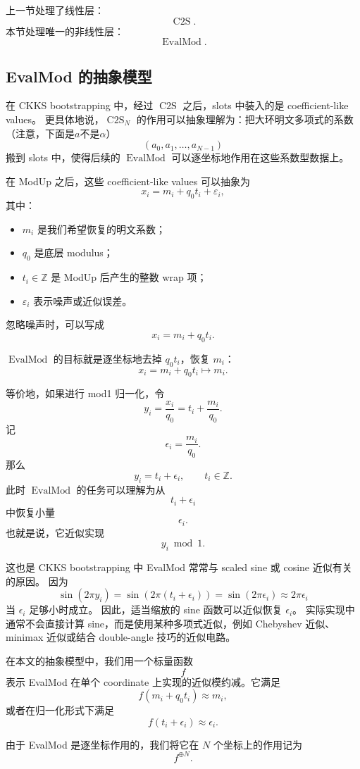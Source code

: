 \documentclass[UTF8,11pt]{ctexart}
\theoremstyle{definition}
\newcommand{\CtwoS}{\operatorname{C2S}}
\newcommand{\EvalMod}{\operatorname{EvalMod}}
\begin{document}
上一节处理了线性层：
\[
\CtwoS.
\]
本节处理唯一的非线性层：
\[
\EvalMod.
\]

\subsection{EvalMod 的抽象模型}

在 CKKS bootstrapping 中，经过 \(\CtwoS\) 之后，slots 中装入的是 coefficient-like values。
更具体地说，\(\CtwoS_N\) 的作用可以抽象理解为：把大环明文多项式的系数（注意，下面是$a$不是$\alpha$）
\[
(a_0,a_1,\ldots,a_{N-1})
\]
搬到 slots 中，使得后续的 \(\EvalMod\) 可以逐坐标地作用在这些系数型数据上。

在 ModUp 之后，这些 coefficient-like values 可以抽象为
\[
x_i=m_i+q_0t_i+\varepsilon_i,
\]
其中：
\begin{itemize}
    \item \(m_i\) 是我们希望恢复的明文系数；
    \item \(q_0\) 是底层 modulus；
    \item \(t_i\in\mathbb Z\) 是 ModUp 后产生的整数 wrap 项；
    \item \(\varepsilon_i\) 表示噪声或近似误差。
\end{itemize}

忽略噪声时，可以写成
\[
x_i=m_i+q_0t_i.
\]

$\EvalMod$ 的目标就是逐坐标地去掉 \(q_0t_i\)，恢复 \(m_i\)：
\[
x_i=m_i+q_0t_i
\longmapsto
m_i.
\]

等价地，如果进行 mod1 归一化，令
\[
y_i=\frac{x_i}{q_0}
=
t_i+\frac{m_i}{q_0}.
\]
记
\[
\epsilon_i=\frac{m_i}{q_0}.
\]
那么
\[
y_i=t_i+\epsilon_i,
\qquad t_i\in\mathbb Z.
\]
此时 \(\EvalMod\) 的任务可以理解为从
\[
t_i+\epsilon_i
\]
中恢复小量
\[
\epsilon_i.
\]
也就是说，它近似实现
\[
y_i \bmod 1.
\]

这也是 CKKS bootstrapping 中 EvalMod 常常与 scaled sine 或 cosine 近似有关的原因。
因为
\[
\sin(2\pi y_i)
=
\sin(2\pi(t_i+\epsilon_i))
=
\sin(2\pi\epsilon_i)
\approx
2\pi\epsilon_i
\]
当 \(\epsilon_i\) 足够小时成立。
因此，适当缩放的 sine 函数可以近似恢复 \(\epsilon_i\)。
实际实现中通常不会直接计算 sine，而是使用某种多项式近似，例如 Chebyshev 近似、minimax 近似或结合 double-angle 技巧的近似电路。

在本文的抽象模型中，我们用一个标量函数
\[
f
\]
表示 EvalMod 在单个 coordinate 上实现的近似模约减。它满足
\[
f(m_i+q_0t_i)\approx m_i,
\]
或者在归一化形式下满足
\[
f(t_i+\epsilon_i)\approx \epsilon_i.
\]

由于 EvalMod 是逐坐标作用的，我们将它在 \(N\) 个坐标上的作用记为
\[
f^{\oplus N}.
\]
\end{document}
